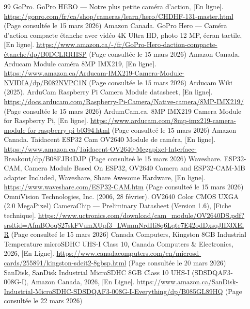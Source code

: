 %
%

\begin{thebibliographyUL}{99} %
     GoPro. GoPro HERO — Notre plus petite caméra d'action, [En ligne]. \url{https://gopro.com/fr/ca/shop/cameras/learn/hero/CHDHF-131-master.html} (Page consultée le 15 mars 2026)
     Amazon Canada. GoPro Hero — Caméra d'action compacte étanche avec vidéo 4K Ultra HD, photo 12 MP, écran tactile, [En ligne]. \url{https://www.amazon.ca/-/fr/GoPro-Hero-daction-compacte-étanche/dp/B0DCLRRHSP} (Page consultée le 15 mars 2026)
     Amazon Canada. Arducam Module caméra 8MP IMX219, [En ligne]. \url{https://www.amazon.ca/Arducam-IMX219-Camera-Module-NVIDIA/dp/B082NVPC1N} (Page consultée le 15 mars 2026)
     Arducam Wiki (2025). ArduCam Raspberry Pi Camera Module datasheet, [En ligne]. \url{https://docs.arducam.com/Raspberry-Pi-Camera/Native-camera/8MP-IMX219/} (Page consultée le 15 mars 2026)
     ArdumCam.ca. 8MP IMX219 Camera Module for Raspberry Pi, [En ligne]. \url{https://www.arducam.com/8mp-imx219-camera-module-for-raspberry-pi-b0394.html} (Page consulteé le 15 mars 2026)
     Amazon Canada. Taidacent ESP32 Cam OV2640 Module de caméra, [En ligne]. \url{https://www.amazon.ca/Taidacent-OV2640-Megapixel-Interface-Breakout/dp/B08FJB4DJP} (Page consulteé le 15 mars 2026)
     Waveshare. ESP32-CAM, Camera Module Based On ESP32, OV2640 Camera and ESP32-CAM-MB adapter Included, Waveshare, Share Awesome Hardware, [En ligne]. \url{https://www.waveshare.com/ESP32-CAM.htm} (Page consulteé le 15 mars 2026)
     OmniVision Technologies, Inc. (2006, 28 février). OV2640 Color CMOS UXGA (2.0 MegaPixel) CameraChip — Preliminary Datasheet (Version 1.6), [Fiche technique]. \url{https://www.uctronics.com/download/cam_module/OV2640DS.pdf?srsltid=AfmBOoqS27skFVumXUpf3_LWmmNrdHi8q6Lqte7E42odDxsqJID3XElR} (Page consulteé le 15 mars 2026)
     Canada Computers, Kingston 8GB Industrial Temperature microSDHC UHS-I Class 10, Canada Computers \& Electronics, 2026, [En Ligne]. \url{https://www.canadacomputers.com/en/microsd-cards/255891/kingston-sdcit2-8gbsp.html} (Page consultée le 20 mars 2026)
     SanDisk, SanDisk Industrial MicroSDHC 8GB Class 10 UHS-I (SDSDQAF3-008G-I), Amazon Canada, 2026, [En Ligne]. \url{https://www.amazon.ca/SanDisk-Industrial-MicroSDHC-SDSDQAF3-008G-I-Everything/dp/B085GL89HQ} (Page consultée le 22 mars 2026)

\end{thebibliographyUL}
